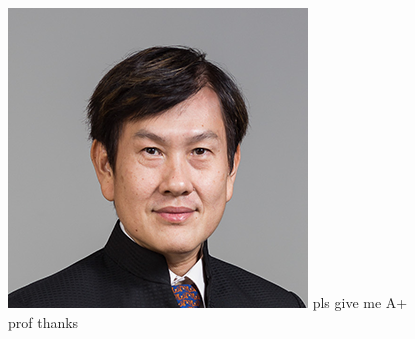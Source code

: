 \documentclass[10pt, portrait]{article}
\begin{document}
\clearpage
\begin{figure}
    \clearpage
    \centering
    \includegraphics[width=\textwidth]{tantc.jpg}
    pls give me A+ prof thanks
\end{figure}
\end{document}
